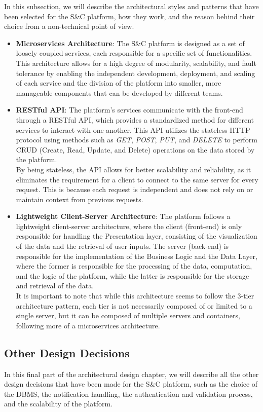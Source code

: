 In this subsection, we will describe the architectural styles and patterns that have been selected for the S\&C platform, how they work, and the reason behind their choice from a non-technical point of view.
\begin{itemize}
    \item \textbf{Microservices Architecture}: The S\&C platform is designed as a set of loosely coupled services, each responsible for a specific set of functionalities. This architecture allows for a high degree of modularity, scalability, and fault tolerance by enabling the independent development, deployment, and scaling of each service and the division of the platform into smaller, more manageable components that can be developed by different teams.
    \item \textbf{RESTful API}: The platform's services communicate with the front-end through a RESTful API, which provides a standardized method for different services to interact with one another. This API utilizes the stateless HTTP protocol using methods such as \textit{GET}, \textit{POST}, \textit{PUT}, and \textit{DELETE} to perform CRUD (Create, Read, Update, and Delete) operations on the data stored by the platform.\\
    By being stateless, the API allows for better scalability and reliability, as it eliminates the requirement for a client to connect to the same server for every request. This is because each request is independent and does not rely on or maintain context from previous requests.
    \item \textbf{Lightweight Client-Server Architecture}: The platform follows a lightweight client-server architecture, where the client (front-end) is only responsible for handling the Presentation layer, consisting of the visualization of the data and the retrieval of user inputs. The server (back-end) is responsible for the implementation of the Business Logic and the Data Layer, where the former is responsible for the processing of the data, computation, and the logic of the platform, while the latter is responsible for the storage and retrieval of the data.\\
    It is important to note that while this architecture seems to follow the 3-tier architecture pattern, each tier is not necessarily composed of or limited to a single server, but it can be composed of multiple servers and containers, following more of a microservices architecture.
\end{itemize}
\subsection{Other Design Decisions}
    In this final part of the architectural design chapter, we will describe all the other design decisions that have been made for the S\&C platform, such as the choice of the DBMS, the notification handling, the authentication and validation process, and the scalability of the platform.
